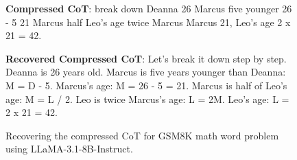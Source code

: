 \begin{figure}[t]
\begin{tcolorbox}[colback=blue!5!white,colframe=blue!75!black,title=Revovering the Compressed Chain-of-Thought,fontupper=\footnotesize,fonttitle=\scriptsize]
\textbf{Compressed CoT}: break down Deanna 26 Marcus five younger 26 - 5 21 Marcus half Leo's age twice Marcus Marcus 21, Leo's age 2 x 21 = 42.

\vskip 0.1in
        
\textbf{Recovered Compressed CoT}: Let's break it down step by step. Deanna is 26 years old. Marcus is five years younger than Deanna: M = D - 5. Marcus's age: M = 26 - 5 = 21. Marcus is half of Leo's age: M = L / 2. Leo is twice Marcus's age: L = 2M. Leo's age: L = 2 x 21 = 42.

\end{tcolorbox}
\caption{Recovering the compressed CoT for GSM8K math word problem using LLaMA-3.1-8B-Instruct.}
\label{fig:recovery}
\end{figure}